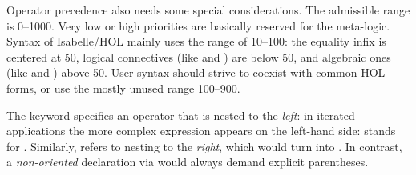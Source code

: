 \begin{isabellebody}
\begin{isamarkuptext}
  Operator precedence also needs some special considerations.  The
  admissible range is 0--1000.  Very low or high priorities are
  basically reserved for the meta-logic.  Syntax of Isabelle/HOL
  mainly uses the range of 10--100: the equality infix \isa{{\isacharequal}} is
  centered at 50, logical connectives (like \isa{{\isasymor}} and \isa{{\isasymand}}) are below 50, and algebraic ones (like \isa{{\isacharplus}} and \isa{{\isacharasterisk}}) above 50.  User syntax should strive to coexist with common
  HOL forms, or use the mostly unused range 100--900.

  \medskip The keyword  specifies an operator that
  is nested to the \emph{left}: in iterated applications the more
  complex expression appears on the left-hand side:  stands for .  Similarly,
   refers to nesting to the \emph{right}, which
  would turn  into .
  In contrast, a \emph{non-oriented} declaration via
   would always demand explicit parentheses.
  

\end{isamarkuptext}
\end{isabellebody}
